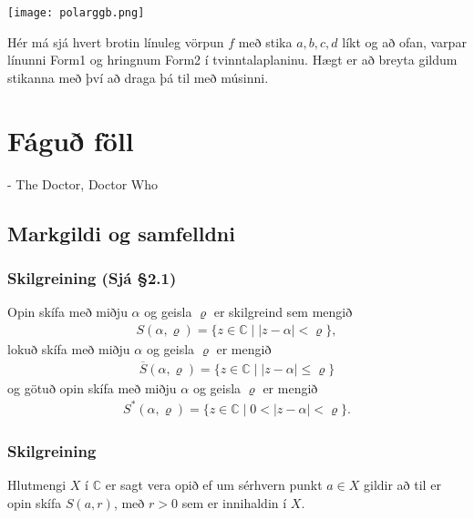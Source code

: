 \documentclass[a4paper,10pt,icelandic]{sphinxmanual}
\begin{document}
\begin{center}
\texttt{[image: polarggb.png]}
\end{center}


Hér má sjá hvert brotin línuleg vörpun \(f\) með stika \(a,b,c,d\) líkt og að ofan, varpar línunni Form1 og hringnum Form2 í tvinntalaplaninu. Hægt er að breyta gildum stikanna með því að draga þá til með músinni.


\chapter{Fáguð föll}
\label{\detokenize{Kafli02:fagu-foll}}\label{\detokenize{Kafli02::doc}}

- The Doctor, Doctor Who


\section{Markgildi og samfelldni}
\label{\detokenize{Kafli02:markgildi-og-samfelldni}}

\subsection{Skilgreining (Sjá \S{}2.1)}
\label{\detokenize{Kafli02:skilgreining-sja-2-1}}
Opin skífa með miðju \(\alpha\) og
geisla \(\varrho\) er skilgreind sem mengið
\begin{equation*}
\begin{split}S(\alpha,\varrho)=\{z\in {\mathbb{C}}\mid |z-\alpha|<\varrho\},\end{split}
\end{equation*}
lokuð skífa með miðju \(\alpha\) og geisla \(\varrho\) er
mengið
\begin{equation*}
\begin{split}\overline S(\alpha,\varrho)=\{z\in {\mathbb{C}}\mid |z-\alpha|\leq\varrho\}\end{split}
\end{equation*}
og götuð opin skífa með miðju \(\alpha\) og geisla \(\varrho\)
er mengið
\begin{equation*}
\begin{split}S^*(\alpha,\varrho)=\{z\in {\mathbb{C}}\mid 0<|z-\alpha|<\varrho\}.\end{split}
\end{equation*}

\subsection{Skilgreining}
\label{\detokenize{Kafli02:skilgreining}}
Hlutmengi \(X\) í \({\mathbb{C}}\) er sagt vera opið ef
um sérhvern punkt \(a\in X\) gildir að til er opin skífa
\(S(a,r)\), með \(r>0\) sem er innihaldin í \(X\).
\end{document}
